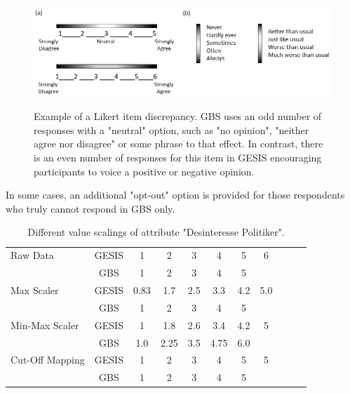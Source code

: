 \begin{figure}[ht]
	\begin{center}
		\includegraphics[scale=0.55,angle=0]{fig/scales}
		\label{6_5}
		\caption{Example of a Likert item discrepancy. GBS uses an odd number of responses with a "neutral" option, such as "no opinion", "neither agree nor disagree" or some phrase to that effect. In contrast, there is an even number of responses for this item in GESIS encouraging participants to voice a positive or negative opinion.}
	\end{center}
\end{figure}

In some cases, an additional "opt-out" option is provided for those respondents who truly cannot respond in GBS only.

\begin{table}[ht]
    \begin{center}
            {\footnotesize
            \begin{tabular}{l|c|ccccccccc}
                \hline \hline
		Raw Data & GESIS & 1 & 2 & 3 & 4 & 5 & 6 \\
                     & GBS & 1 & 2 & 3 & 4 & 5 & \\
                \hline
		Max Scaler & GESIS & 0.83 & 1.7 & 2.5 & 3.3 & 4.2 & 5.0 \\
                     & GBS & 1 & 2 & 3 & 4 & 5 & \\
                \hline
		Min-Max Scaler & GESIS & 1 & 1.8 & 2.6 & 3.4 & 4.2 & 5 \\
                     & GBS & 1.0 & 2.25 & 3.5 & 4.75 & 6.0 & \\
                \hline
		Cut-Off Mapping & GESIS & 1 & 2 & 3 & 4 & 5 & 5 \\
                     & GBS & 1 & 2 & 3 & 4 & 5 & \\
            \end{tabular}}
        \caption{Different value scalings of attribute "Desinteresse Politiker".}
\label{Tab:DescripStatsRawData}
\end{center}
\end{table}




